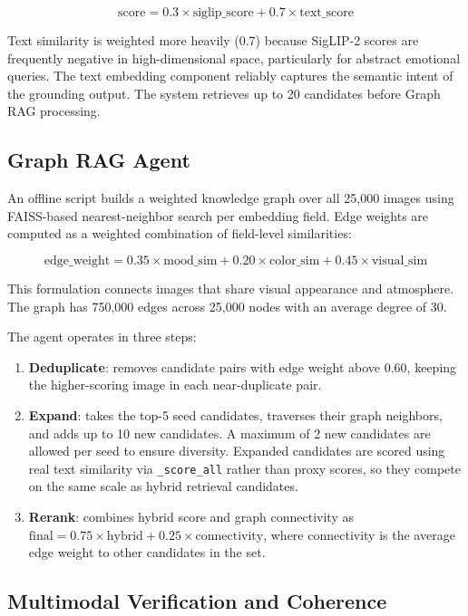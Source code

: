 \documentclass[
  11pt,
]{article}
\providecommand{\tightlist}{%
  \setlength{\itemsep}{0pt}\setlength{\parskip}{0pt}}\usepackage{longtable,booktabs,array}
\begin{document}
\[\text{score} = 0.3 \times \text{siglip\_score} + 0.7 \times \text{text\_score}\]

Text similarity is weighted more heavily (0.7) because SigLIP-2 scores
are frequently negative in high-dimensional space, particularly for
abstract emotional queries. The text embedding component reliably
captures the semantic intent of the grounding output. The system
retrieves up to 20 candidates before Graph RAG processing.

\subsection{Graph RAG Agent}\label{graph-rag-agent}

An offline script builds a weighted knowledge graph over all 25,000
images using FAISS-based nearest-neighbor search per embedding field.
Edge weights are computed as a weighted combination of field-level
similarities:

\[\text{edge\_weight} = 0.35 \times \text{mood\_sim} + 0.20 \times \text{color\_sim} + 0.45 \times \text{visual\_sim}\]

This formulation connects images that share visual appearance and
atmosphere. The graph has 750,000 edges across 25,000 nodes with an
average degree of 30.

The agent operates in three steps:

\begin{enumerate}
\def\labelenumi{\arabic{enumi}.}
\tightlist
\item
  \textbf{Deduplicate}: removes candidate pairs with edge weight above
  0.60, keeping the higher-scoring image in each near-duplicate pair.
\item
  \textbf{Expand}: takes the top-5 seed candidates, traverses their
  graph neighbors, and adds up to 10 new candidates. A maximum of 2 new
  candidates are allowed per seed to ensure diversity. Expanded
  candidates are scored using real text similarity via
  \texttt{\_score\_all} rather than proxy scores, so they compete on the
  same scale as hybrid retrieval candidates.
\item
  \textbf{Rerank}: combines hybrid score and graph connectivity as
  \(\text{final} = 0.75 \times \text{hybrid} + 0.25 \times \text{connectivity}\),
  where connectivity is the average edge weight to other candidates in
  the set.
\end{enumerate}

\subsection{Multimodal Verification and
Coherence}\label{multimodal-verification-and-coherence}
\end{document}

